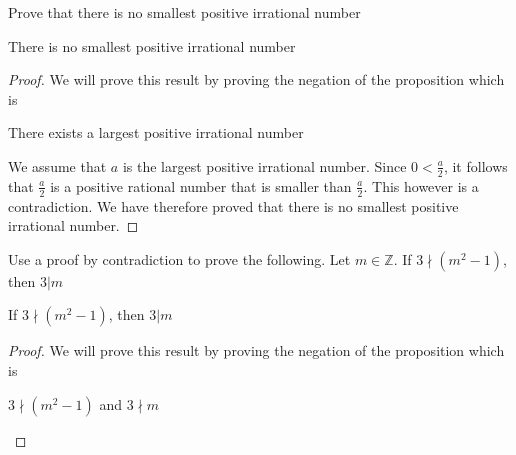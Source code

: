 \newpage
\begin{example}
Prove that there is no smallest positive irrational number
\begin{tcolorbox}
    \begin{theorem}
        There is no smallest positive irrational number
    \end{theorem} 
\end{tcolorbox}


\begin{proof}

We will prove this result by proving the negation of the proposition which is
	\begin{center}
		There exists a largest positive irrational number
	\end{center}

We assume that $a$ is the largest positive irrational number. Since $0 < \frac{a}{2}$, it follows that $\frac{a}{2}$ is a positive rational number that is smaller than $\frac{a}{2}$. This however is a contradiction. We have therefore proved that there is no smallest positive irrational number.
\end{proof}
\end{example}

\newpage
\begin{example}
Use a proof by contradiction to prove the following. Let $m \in \mathbb{Z}$. If $3 \nmid (m^2 - 1)$, then $3 | m$
\begin{tcolorbox}
    \begin{theorem}
        If $3 \nmid (m^2 - 1)$, then $3 | m$
    \end{theorem} 
\end{tcolorbox}

\begin{proof}
We will prove this result by proving the negation of the proposition which is
	\begin{center}
		$3 \nmid (m^2 - 1)$ and $3 \nmid m$
	\end{center}


\end{proof}
\end{example}

































